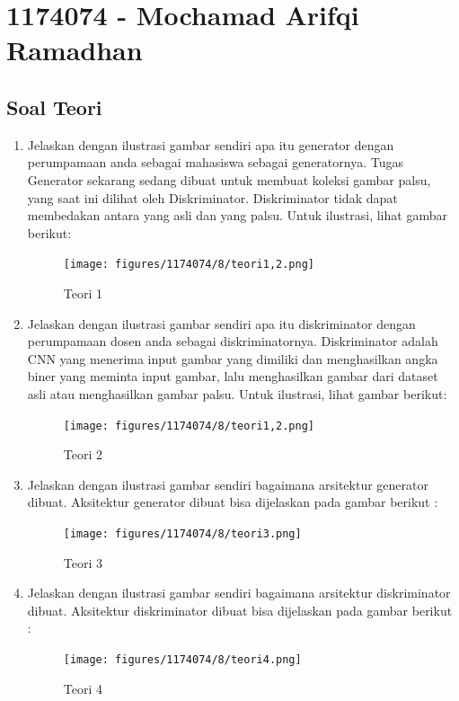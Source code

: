 \section{1174074 - Mochamad Arifqi Ramadhan}
\subsection{Soal Teori}
\begin{enumerate}
    \item Jelaskan dengan ilustrasi gambar sendiri apa itu generator dengan perumpamaan anda sebagai mahasiswa sebagai generatornya.
    \hfill\break
    Tugas Generator sekarang sedang dibuat untuk membuat koleksi gambar palsu, yang saat ini dilihat oleh Diskriminator. Diskriminator tidak dapat membedakan antara yang asli dan yang palsu. Untuk ilustrasi, lihat gambar berikut: 
    \begin{figure}[H]
		\texttt{[image: figures/1174074/8/teori1,2.png]}
		\centering
		\caption{Teori 1}
    \end{figure}

    \item Jelaskan dengan ilustrasi gambar sendiri apa itu diskriminator dengan perumpamaan dosen anda sebagai diskriminatornya.
    \hfill\break
    Diskriminator adalah CNN yang menerima input gambar yang dimiliki dan menghasilkan angka biner yang meminta input gambar, lalu menghasilkan gambar dari dataset asli atau menghasilkan gambar palsu. Untuk ilustrasi, lihat gambar berikut: 
    \begin{figure}[H]
		\texttt{[image: figures/1174074/8/teori1,2.png]}
		\centering
		\caption{Teori 2}
    \end{figure}

    \item Jelaskan dengan ilustrasi gambar sendiri bagaimana arsitektur generator dibuat.
	\hfill\break
    Aksitektur generator dibuat bisa dijelaskan pada gambar berikut :
    \begin{figure}[H]
		\texttt{[image: figures/1174074/8/teori3.png]}
		\centering
		\caption{Teori 3}
    \end{figure}

    \item Jelaskan dengan ilustrasi gambar sendiri bagaimana arsitektur diskriminator dibuat.
	\hfill\break
    Aksitektur diskriminator dibuat bisa dijelaskan pada gambar berikut :
    \begin{figure}[H]
		\texttt{[image: figures/1174074/8/teori4.png]}
		\centering
		\caption{Teori 4}
    \end{figure}


\end{enumerate}

